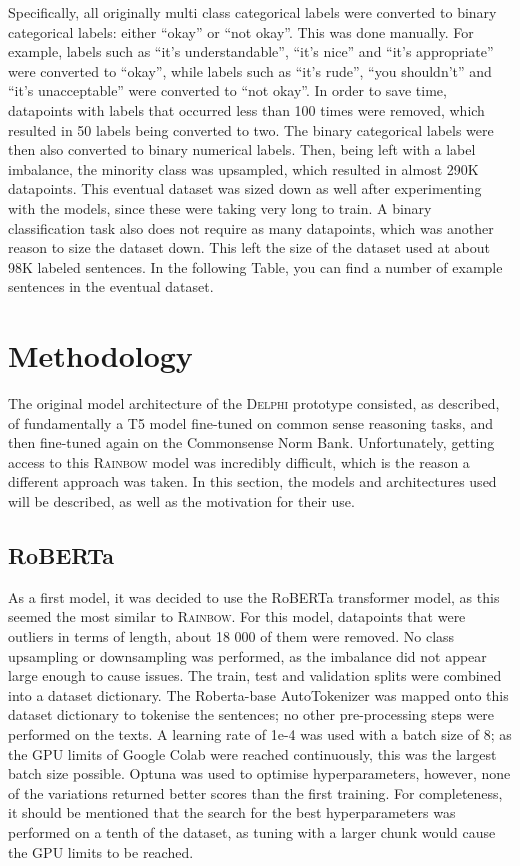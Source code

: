 \documentclass[final]{clv3} %
\begin{document}
Specifically, all originally multi class categorical labels were converted to binary categorical labels: either “okay” or “not okay”. This was done manually. For example, labels such as “it’s understandable”, “it’s nice” and “it’s appropriate” were converted to “okay”, while labels such as “it’s rude”, “you shouldn’t” and “it’s unacceptable” were converted to “not okay”. In order to save time, datapoints with labels that occurred less than 100 times were removed, which resulted in 50 labels being converted to two. The binary categorical labels were then also converted to binary numerical labels. Then, being left with a label imbalance, the minority class was upsampled, which resulted in almost 290K datapoints. This eventual dataset was sized down as well after experimenting with the models, since these were taking very long to train. A binary classification task also does not require as many datapoints, which was another reason to size the dataset down. This left the size of the dataset used at about 98K labeled sentences. In the following Table, you can find a number of example sentences in the eventual dataset. 

\section{Methodology}

The original model architecture of the \textsc{Delphi} prototype consisted, as described, of fundamentally a T5 model fine-tuned on common sense reasoning tasks, and then fine-tuned again on the Commonsense Norm Bank. Unfortunately, getting access to this \textsc{Rainbow} model was incredibly difficult, which is the reason a different approach was taken. In this section, the models and architectures used will be described, as well as the motivation for their use. \\

\subsection{RoBERTa}

As a first model, it was decided to use the RoBERTa transformer model, as this seemed the most similar to \textsc{Rainbow}. For this model, datapoints that were outliers in terms of length, about 18 000 of them were removed. No class upsampling or downsampling was performed, as the imbalance did not appear large enough to cause issues. The train, test and validation splits were combined into a dataset dictionary. The Roberta-base AutoTokenizer was mapped onto this dataset dictionary to tokenise the sentences; no other pre-processing steps were performed on the texts. A learning rate of 1e-4 was used with a batch size of 8; as the GPU limits of Google Colab were reached continuously, this was the largest batch size possible. Optuna was used to optimise hyperparameters, however, none of the variations returned better scores than the first training. For completeness, it should be mentioned that the search for the best hyperparameters was performed on a tenth of the dataset, as tuning with a larger chunk would cause the GPU limits to be reached.
\end{document}
